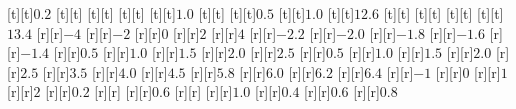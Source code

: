 \begin{psfrags}
[t][t]{$0.2$}%
[t][t]{}%
[t][t]{}%
[t][t]{}%
[t][t]{$1.0$}%
[t][t]{}%
[t][t]{$0.5$}%
[t][t]{$1.0$}%
[t][t]{$12.6$}%
[t][t]{}%
[t][t]{}%
[t][t]{}%
[t][t]{$13.4$}%
%
[r][r]{$-4\!$}%
[r][r]{$-2$}%
[r][r]{$0$}%
[r][r]{$2$}%
[r][r]{$4$}%
[r][r]{$-2.2$}%
[r][r]{$-2.0$}%
[r][r]{$-1.8$}%
[r][r]{$-1.6$}%
[r][r]{$-1.4$}%
[r][r]{$0.5\!$}%
[r][r]{$1.0$}%
[r][r]{$1.5$}%
[r][r]{$2.0$}%
[r][r]{$2.5$}%
[r][r]{$0.5$}%
[r][r]{$1.0$}%
[r][r]{$1.5$}%
[r][r]{$2.0$}%
[r][r]{$2.5$}%
[r][r]{$3.5\!$}%
[r][r]{$4.0$}%
[r][r]{$4.5$}%
[r][r]{$5.8$}%
[r][r]{$6.0$}%
[r][r]{$6.2$}%
[r][r]{$6.4$}%
[r][r]{$-1$}%
[r][r]{$0$}%
[r][r]{$1$}%
[r][r]{$2\!$}%
[r][r]{$0.2$}%
[r][r]{}%
[r][r]{$0.6$}%
[r][r]{}%
[r][r]{$1.0$}%
[r][r]{$0.4$}%
[r][r]{$0.6$}%
[r][r]{$0.8$}%
%
%
\end{psfrags}%
%
